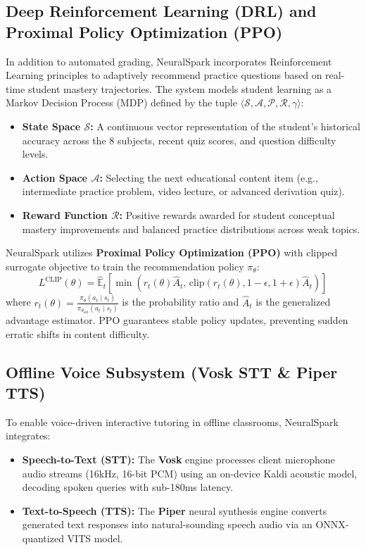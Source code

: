 \subsection{Deep Reinforcement Learning (DRL) and Proximal Policy Optimization (PPO)}
In addition to automated grading, NeuralSpark incorporates Reinforcement Learning principles to adaptively recommend practice questions based on real-time student mastery trajectories. The system models student learning as a Markov Decision Process (MDP) defined by the tuple $\langle \mathcal{S}, \mathcal{A}, \mathcal{P}, \mathcal{R}, \gamma \rangle$:
\begin{itemize}[leftmargin=*]
    \item \textbf{State Space $\mathcal{S}$:} A continuous vector representation of the student's historical accuracy across the 8 subjects, recent quiz scores, and question difficulty levels.
    \item \textbf{Action Space $\mathcal{A}$:} Selecting the next educational content item (e.g., intermediate practice problem, video lecture, or advanced derivation quiz).
    \item \textbf{Reward Function $\mathcal{R}$:} Positive rewards awarded for student conceptual mastery improvements and balanced practice distributions across weak topics.
\end{itemize}

NeuralSpark utilizes \textbf{Proximal Policy Optimization (PPO)} with clipped surrogate objective to train the recommendation policy $\pi_\theta$:
\begin{equation}
    L^{\text{CLIP}}(\theta) = \hat{\mathbb{E}}_t \left[ \min\left( r_t(\theta) \hat{A}_t, \, \text{clip}(r_t(\theta), 1 - \epsilon, 1 + \epsilon) \hat{A}_t \right) \right]
\end{equation}
where $r_t(\theta) = \frac{\pi_\theta(a_t \mid s_t)}{\pi_{\theta_{\text{old}}}(a_t \mid s_t)}$ is the probability ratio and $\hat{A}_t$ is the generalized advantage estimator. PPO guarantees stable policy updates, preventing sudden erratic shifts in content difficulty.

\subsection{Offline Voice Subsystem (Vosk STT \& Piper TTS)}
To enable voice-driven interactive tutoring in offline classrooms, NeuralSpark integrates:
\begin{itemize}[leftmargin=*]
    \item \textbf{Speech-to-Text (STT):} The \textbf{Vosk} engine processes client microphone audio streams (16kHz, 16-bit PCM) using an on-device Kaldi acoustic model, decoding spoken queries with sub-180ms latency.
    \item \textbf{Text-to-Speech (TTS):} The \textbf{Piper} neural synthesis engine converts generated text responses into natural-sounding speech audio via an ONNX-quantized VITS model.
\end{itemize}

